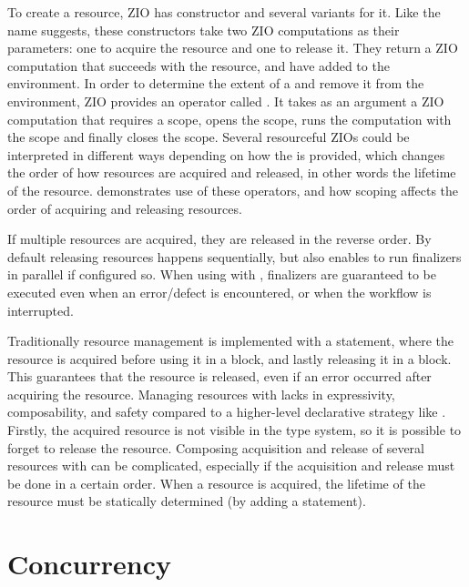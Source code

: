 To create a resource, ZIO has  constructor and several variants for it. Like the name suggests, these constructors take two ZIO computations as their parameters: one to acquire the resource and one to release it. They return a ZIO computation that succeeds with the resource, and have added  to the environment. In order to determine the extent of a  and remove it from the environment, ZIO provides an operator called . It takes as an argument a ZIO computation that requires a scope, opens the scope, runs the computation with the scope and finally closes the scope. Several resourceful ZIOs could be interpreted in different ways depending on how the  is provided, which changes the order of how resources are acquired and released, in other words the lifetime of the resource.  demonstrates use of these operators, and how scoping affects the order of acquiring and releasing resources.



If multiple resources are acquired, they are released in the reverse order. By default releasing resources happens sequentially, but  also enables to run finalizers in parallel if configured so. When using  with , finalizers are guaranteed to be executed even when an error/defect is encountered, or when the workflow is interrupted.

Traditionally resource management is implemented with a  statement, where the resource is acquired before using it in a  block, and lastly releasing it in a  block. This guarantees that the resource is released, even if an error occurred after acquiring the resource. Managing resources with  lacks in expressivity, composability, and safety compared to a higher-level declarative strategy like . Firstly, the acquired resource is not visible in the type system, so it is possible to forget to release the resource. Composing acquisition and release of several resources with  can be complicated, especially if the acquisition and release must be done in a certain order. When a resource is acquired, the lifetime of the resource must be statically determined (by adding a  statement).



\section{Concurrency}

